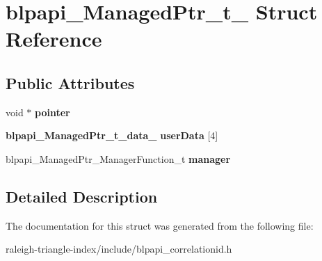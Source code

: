 \section{blpapi\+\_\+\+Managed\+Ptr\+\_\+t\+\_\+ Struct Reference}
\label{structblpapi___managed_ptr__t__}
\subsection*{Public Attributes}
\begin{DoxyCompactItemize}
\item 
void $\ast$ {\bfseries pointer}\label{structblpapi___managed_ptr__t___af5a90f9f34e8ebb8465b1d1d47efd70f}

\item 
{\bf blpapi\+\_\+\+Managed\+Ptr\+\_\+t\+\_\+data\+\_\+} {\bfseries user\+Data} [4]\label{structblpapi___managed_ptr__t___a710c979ff6ce427bd77443520ea4731e}

\item 
blpapi\+\_\+\+Managed\+Ptr\+\_\+\+Manager\+Function\+\_\+t {\bfseries manager}\label{structblpapi___managed_ptr__t___a163e0d9d559bac0781107a7cb2369b74}

\end{DoxyCompactItemize}


\subsection{Detailed Description}


The documentation for this struct was generated from the following file\+:\begin{DoxyCompactItemize}
\item 
raleigh-\/triangle-\/index/include/blpapi\+\_\+correlationid.\+h\end{DoxyCompactItemize}
